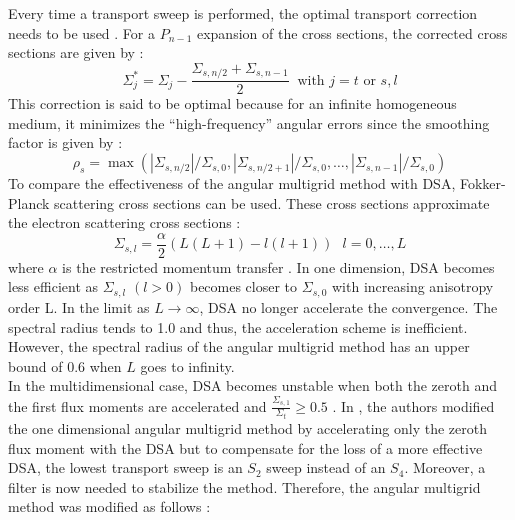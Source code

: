 Every time a transport sweep is performed, the optimal transport correction
needs to be used \cite{multigrid_1d}. For a $P_{n-1}$ expansion of the cross
sections, the corrected cross sections are given by :
\begin{equation}
\Sigma_{j}^* = \Sigma_{j} -\frac{\Sigma_{s,n/2}+\Sigma_{s,n-1}}{2}\ 
\textrm{ with }j=t \textrm{ or }s,l
\end{equation}
This correction is said to be optimal because for an infinite homogeneous medium, 
it minimizes the ``high-frequency'' angular errors since the smoothing factor is 
given by :
\begin{equation}
\rho_s =
\max(|\Sigma_{s,n/2}|/\Sigma_{s,0},|\Sigma_{s,n/2+1}|/\Sigma_{s,0},\hdots,
|\Sigma_{s,n-1}|/\Sigma_{s,0})
\end{equation}
To compare the effectiveness of the angular multigrid method with DSA, 
Fokker-Planck scattering cross sections can be used. These cross sections 
approximate the electron scattering cross sections \cite{morel_81} :
\begin{equation}
\Sigma_{s,l} = \frac{\alpha}{2} (L(L+1)-l(l+1))\ \ \ l=0,\hdots,L
\end{equation}
where $\alpha$ is the restricted momentum transfer \cite{morel_96}. In one dimension,
DSA becomes less efficient as $\Sigma_{s,l}$ $(l>0)$ becomes closer to
$\Sigma_{s,0}$ with increasing anisotropy order L. In the limit as 
$L\rightarrow \infty$, DSA no
longer accelerate the convergence. The spectral radius tends to 1.0 and thus,
the acceleration scheme is inefficient. However, the spectral radius of the
angular multigrid method has an upper bound of 0.6 when $L$ goes to
infinity.\\
In the multidimensional case, DSA becomes unstable when both the zeroth
and the first flux moments are accelerated and $\frac{\Sigma_{s,1}}{\Sigma_t}
\geq 0.5$ \cite{multisweep}. In \cite{multigrid_2d}, the authors modified the
one dimensional angular multigrid method by accelerating only the zeroth flux
moment with the DSA but to compensate for the loss of a more effective DSA,
the lowest transport sweep is an $S_2$ sweep instead of an $S_4$. Moreover, a
filter is now needed to stabilize the method. Therefore, the angular multigrid 
method was modified as follows \cite{multigrid_2d} :
